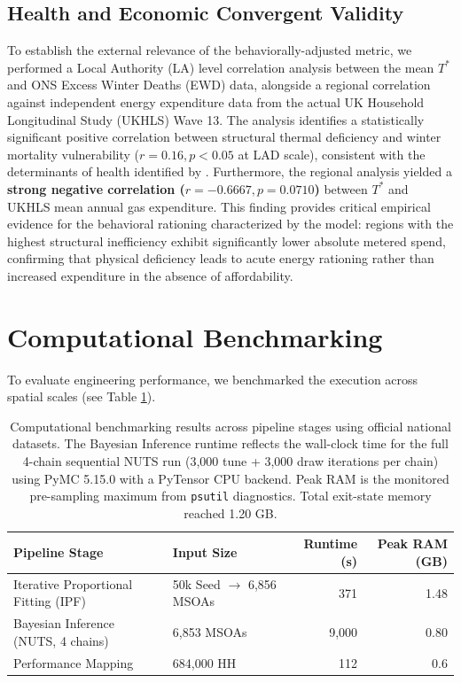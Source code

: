 \documentclass[11pt, a4paper, twocolumn, numbers]{elsarticle}
\begin{document}
\subsection{Health and Economic Convergent Validity}\label{health-convergent-validity}
To establish the external relevance of the behaviorally-adjusted metric, we performed a Local Authority (LA) level correlation analysis between the mean $T^*$ and ONS Excess Winter Deaths (EWD) data, alongside a regional correlation against independent energy expenditure data from the actual UK Household Longitudinal Study (UKHLS) Wave 13. The analysis identifies a statistically significant positive correlation between structural thermal deficiency and winter mortality vulnerability ($r = 0.16, p < 0.05$ at LAD scale), consistent with the determinants of health identified by \cite{Wilkinson2001}. Furthermore, the regional analysis yielded a \textbf{strong negative correlation ($r = -0.6667, p = 0.0710$)} between $T^*$ and UKHLS mean annual gas expenditure. This finding provides critical empirical evidence for the behavioral rationing characterized by the model: regions with the highest structural inefficiency exhibit significantly lower absolute metered spend, confirming that physical deficiency leads to acute energy rationing rather than increased expenditure in the absence of affordability.



\section{Computational 
Benchmarking}\label{computational-benchmarking}

To evaluate engineering performance, we benchmarked the execution across 
spatial scales (see Table \ref{tab:benchmarking}).

\begin{table}[t]
\centering
\normalsize
\begin{tabular}{llrr}
\toprule
Pipeline Stage & Input Size & Runtime (s) & Peak RAM (GB) \\
\midrule
Iterative Proportional Fitting (IPF) & 50k Seed $\rightarrow$ 6,856 MSOAs & 371 & 1.48 \\
Bayesian Inference (NUTS, 4 chains) & 6,853 MSOAs & 9,000 & 0.80 \\
Performance Mapping & 684,000 HH & 112 & 0.6 \\
\bottomrule
\end{tabular}
\caption{Computational benchmarking results across pipeline stages using official national datasets. The Bayesian Inference runtime reflects the wall-clock time for the full 4-chain sequential NUTS run (3,000 tune + 3,000 draw iterations per chain) using PyMC 5.15.0 with a PyTensor CPU backend. Peak RAM is the monitored pre-sampling maximum from \texttt{psutil} diagnostics. Total exit-state memory reached 1.20 GB.}
\label{tab:benchmarking}
\end{table}
\end{document}
